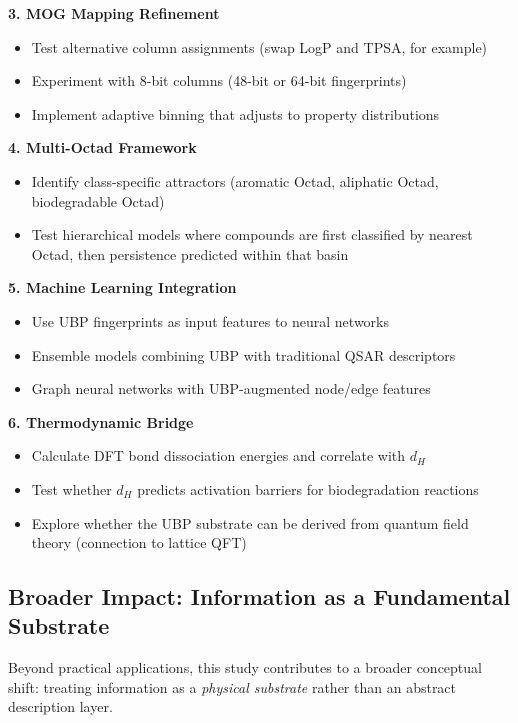 \documentclass[11pt,letterpaper]{article}
\begin{document}
\textbf{3. MOG Mapping Refinement}

\begin{itemize}
    \item Test alternative column assignments (swap LogP and TPSA, for example)
    \item Experiment with 8-bit columns (48-bit or 64-bit fingerprints)
    \item Implement adaptive binning that adjusts to property distributions
\end{itemize}

\textbf{4. Multi-Octad Framework}

\begin{itemize}
    \item Identify class-specific attractors (aromatic Octad, aliphatic Octad, biodegradable Octad)
    \item Test hierarchical models where compounds are first classified by nearest Octad, then persistence predicted within that basin
\end{itemize}

\textbf{5. Machine Learning Integration}

\begin{itemize}
    \item Use UBP fingerprints as input features to neural networks
    \item Ensemble models combining UBP with traditional QSAR descriptors
    \item Graph neural networks with UBP-augmented node/edge features
\end{itemize}

\textbf{6. Thermodynamic Bridge}

\begin{itemize}
    \item Calculate DFT bond dissociation energies and correlate with $d_H$
    \item Test whether $d_H$ predicts activation barriers for biodegradation reactions
    \item Explore whether the UBP substrate can be derived from quantum field theory (connection to lattice QFT)
\end{itemize}

\subsection{Broader Impact: Information as a Fundamental Substrate}

Beyond practical applications, this study contributes to a broader conceptual shift: treating information as a \textit{physical substrate} rather than an abstract description layer.
\end{document}
